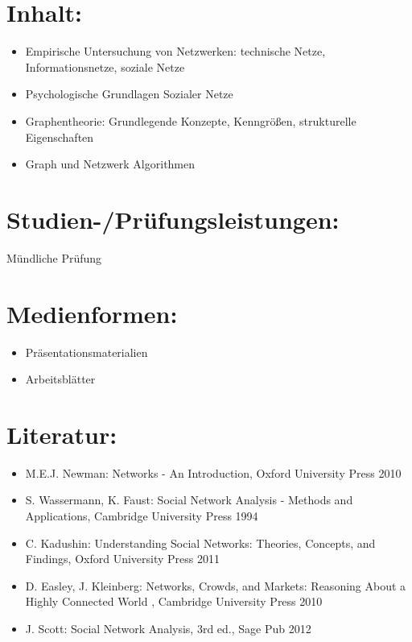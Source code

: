 \section*{Inhalt:}\label{inhalt-11}

\begin{itemize}
\tightlist
\item
  Empirische Untersuchung von Netzwerken: technische Netze,
  Informationsnetze, soziale Netze
\item
  Psychologische Grundlagen Sozialer Netze
\item
  Graphentheorie: Grundlegende Konzepte, Kenngrößen, strukturelle
  Eigenschaften
\item
  Graph und Netzwerk Algorithmen
\end{itemize}

\section*{Studien-/Prüfungsleistungen:}\label{studien-pruxfcfungsleistungen-11}

Mündliche Prüfung

\section*{Medienformen:}\label{medienformen-11}

\begin{itemize}
\tightlist
\item
  Präsentationsmaterialien
\item
  Arbeitsblätter
\end{itemize}

\section*{Literatur:}\label{literatur-8}

\begin{itemize}
\tightlist
\item
  M.E.J. Newman: Networks - An Introduction, Oxford University Press
  2010
\item
  S. Wassermann, K. Faust: Social Network Analysis - Methods and
  Applications, Cambridge University Press 1994
\item
  C. Kadushin: Understanding Social Networks: Theories, Concepts, and
  Findings, Oxford University Press 2011
\item
  D. Easley, J. Kleinberg: Networks, Crowds, and Markets: Reasoning
  About a Highly Connected World , Cambridge University Press 2010
\item
  J. Scott: Social Network Analysis, 3rd ed., Sage Pub 2012
\end{itemize}


